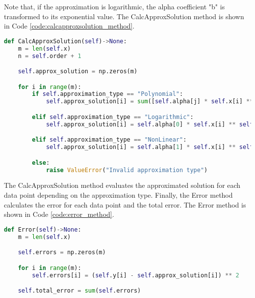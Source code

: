Note that, if the approximation is logarithmic, the alpha coefficient "b" is transformed to its exponential value. The CalcApproxSolution method is shown in Code \ref{code:calcapproxsolution_method}.
\begin{lstlisting}[caption={CalcApproxSolution method},label={code:calcapproxsolution_method},language=python]
def CalcApproxSolution(self)->None:
    m = len(self.x)
    n = self.order + 1

    self.approx_solution = np.zeros(m)

    for i in range(m):
        if self.approximation_type == "Polynomial":
            self.approx_solution[i] = sum([self.alpha[j] * self.x[i] ** j for j in range(n)])

        elif self.approximation_type == "Logarithmic":
            self.approx_solution[i] = self.alpha[0] * self.x[i] ** self.alpha[1]

        elif self.approximation_type == "NonLinear":
            self.approx_solution[i] = self.alpha[1] * self.x[i] ** self.alpha[0]

        else: 
            raise ValueError("Invalid approximation type")
\end{lstlisting}

The CalcApproxSolution method evaluates the approximated solution for each data point depending on the approximation type. Finally, the Error method calculates the error for each data point and the total error. The Error method is shown in Code \ref{code:error_method}.
\begin{lstlisting}[caption={Error method},label={code:error_method},language=python]
def Error(self)->None:
    m = len(self.x)

    self.errors = np.zeros(m)

    for i in range(m):
        self.errors[i] = (self.y[i] - self.approx_solution[i]) ** 2

    self.total_error = sum(self.errors)
\end{lstlisting}